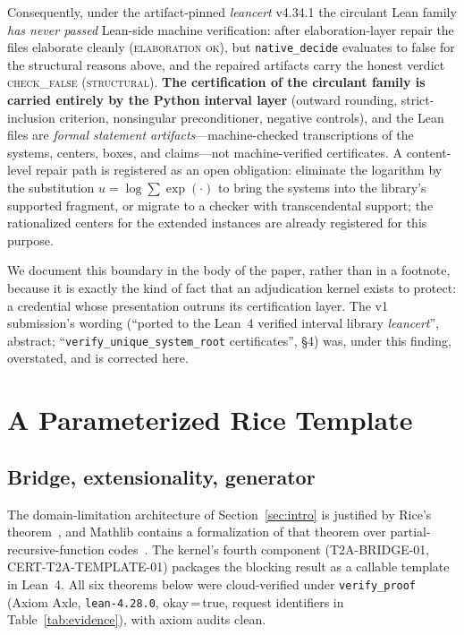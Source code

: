 \documentclass[11pt]{article}
\theoremstyle{definition}
\theoremstyle{remark}
\newcommand{\lean}[1]{\texttt{#1}}
\begin{document}
Consequently, under the artifact-pinned \emph{leancert} v4.34.1 the
circulant Lean family \emph{has never passed} Lean-side machine verification:
after elaboration-layer repair the files elaborate cleanly
(\textsc{elaboration ok}), but \texttt{native\_decide} evaluates to false for
the structural reasons above, and the repaired artifacts carry the honest
verdict \textsc{check\_false (structural)}. \textbf{The certification of the
circulant family is carried entirely by the Python interval layer}
(outward rounding, strict-inclusion criterion, nonsingular preconditioner,
negative controls), and the Lean files are \emph{formal statement
artifacts}---machine-checked transcriptions of the systems, centers, boxes,
and claims---not machine-verified certificates. A content-level repair path
is registered as an open obligation: eliminate the logarithm by the
substitution $u=\log\sum\exp(\cdot)$ to bring the systems into the
library's supported fragment, or migrate to a checker with transcendental
support; the rationalized centers for the extended instances are already
registered for this purpose.

We document this boundary in the body of the paper, rather than in a
footnote, because it is exactly the kind of fact that an adjudication kernel
exists to protect: a credential whose presentation outruns its certification
layer. The v1 submission's wording (``ported to the Lean~4 verified interval
library \emph{leancert}'', abstract; ``\lean{verify\_unique\_system\_root}
certificates'', \S4) was, under this finding, overstated, and is corrected
here.

\section{A Parameterized Rice Template}\label{sec:rice}

\subsection{Bridge, extensionality, generator}

The domain-limitation architecture of Section~\ref{sec:intro} is justified by
Rice's theorem~\cite{rice1953}, and Mathlib contains a formalization of that
theorem over partial-recursive-function codes~\cite{carneiro2019}. The
kernel's fourth component (T2A-BRIDGE-01, CERT-T2A-TEMPLATE-01) packages the
blocking result as a callable template in Lean~4. All six theorems below were
cloud-verified under \texttt{verify\_proof} (Axiom Axle,
\texttt{lean-4.28.0}, okay\,=\,true, request identifiers in
Table~\ref{tab:evidence}), with axiom audits clean.
\end{document}
